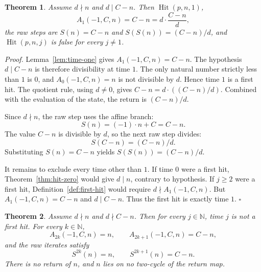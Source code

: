 \documentclass[11pt,letterpaper]{article}
\newcommand{\N}{\mathbb{N}}
\newtheorem{theorem}{Theorem}
\newenvironment{proof}{\noindent\textit{Proof.}}{\hfill\(\square\)}
\begin{document}
\begin{theorem}
\label{thm:hit-one}
Assume \(d\nmid n\) and \(d\mid C-n\). Then \(\operatorname{Hit}(p,n,1)\),
\[
A_1(-1,C,n)=C-n=d\cdot\frac{C-n}{d},
\]
the raw steps are \(S(n)=C-n\) and \(S(S(n))=(C-n)/d\), and
\(\operatorname{Hit}(p,n,j)\) is false for every \(j\neq 1\).
\end{theorem}

\begin{proof}
Lemma~\ref{lem:time-one} gives \(A_1(-1,C,n)=C-n\). The hypothesis
\(d\mid C-n\) is therefore divisibility at time \(1\). The only natural number
strictly less than \(1\) is \(0\), and \(A_0(-1,C,n)=n\) is not divisible by
\(d\). Hence time \(1\) is a first hit. The quotient rule, using \(d\neq 0\),
gives \(C-n=d\cdot((C-n)/d)\). Combined with the evaluation of the state,
the return is \((C-n)/d\).

Since \(d\nmid n\), the raw step uses the affine branch:
\[
S(n)=(-1)\cdot n+C=C-n.
\]
The value \(C-n\) is divisible by \(d\), so the next raw step divides:
\[
S(C-n)=(C-n)/d.
\]
Substituting \(S(n)=C-n\) yields \(S(S(n))=(C-n)/d\).

It remains to exclude every time other than \(1\). If time \(0\) were a first
hit, Theorem~\ref{thm:hit-zero} would give \(d\mid n\), contrary to hypothesis.
If \(j\ge 2\) were a first hit, Definition~\ref{def:first-hit} would require
\(d\nmid A_1(-1,C,n)\). But \(A_1(-1,C,n)=C-n\) and \(d\mid C-n\). Thus the
first hit is exactly time \(1\).
\end{proof}

\begin{theorem}
\label{thm:no-hit}
Assume \(d\nmid n\) and \(d\nmid C-n\). Then for every \(j\in\N\), time \(j\)
is not a first hit. For every \(k\in\N\),
\[
A_{2k}(-1,C,n)=n,\qquad A_{2k+1}(-1,C,n)=C-n,
\]
and the raw iterates satisfy
\[
S^{2k}(n)=n,\qquad S^{2k+1}(n)=C-n.
\]
There is no return of \(n\), and \(n\) lies on no two-cycle of the return map.
\end{theorem}
\end{document}
